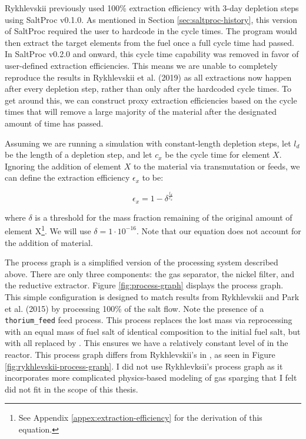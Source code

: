 Rykhlevskii previously used 100\% extraction efficiency with 3-day depletion
steps \cite{rykhlevskii_modeling_2019} using SaltProc v0.1.0. As mentioned in
Section \ref{sec:saltproc-history}, this version of SaltProc required the user
to hardcode in the cycle times. The program would then extract the target
elements from the fuel once a full cycle time had passed. In SaltProc v0.2.0 and
onward, this cycle time capability was removed in favor of user-defined
extraction efficiencies. This means we are unable to completely reproduce the
results in Rykhlevskii et al. (2019)\cite{rykhlevskii_modeling_2019} as all extractions now happen after
every depletion step, rather than only after the hardcoded cycle times.
To get around this, we can construct proxy extraction efficiencies based on the
cycle times that will remove a large majority of the material after the
designated amount of time has passed.

Assuming we are running a simulation with constant-length depletion steps, let
$l_{d}$ be the length of a depletion step, and let $c_{x}$ be the cycle time for
element $X$. Ignoring the addition of element $X$ to the material via
transmutation or feeds, we can define the extraction efficiency $\epsilon_{x}$
to be:

\begin{equation}
    \label{eq:extraction-efficiency}
    \epsilon_{x} = 1 - \delta^{\frac{l_{d}}{c_{x}}}
\end{equation}

where $\delta$ is a threshold for the mass fraction remaining of the original
amount of element X\footnote{See Appendix \ref{appex:extraction-efficiency} for
the derivation of this equation.}. We will use $\delta = 1\cdot 10^{-16}$. Note
that our equation does not account for the addition of material.

The process graph is a simplified version of the processing system described 
above. There are only three components: the gas separator, the nickel filter, and
the reductive extractor. Figure \ref{fig:process-graph} displays the process
graph. This simple configuration is designed to match results from Rykhlevskii
and Park et al. (2015) \cite{park_whole_2015} by processing 100\% of the salt
flow. Note the presence of a \verb.thorium_feed. feed process. This
process replaces the lost mass via reprocessing with an equal mass of fuel salt
of identical composition to the initial fuel salt, but with all 
replaced by . This ensures we have a relatively constant level of
 in the reactor. This process graph differs from Rykhlevskii's
in \cite{rykhlevskii_fuel_2020}, as seen in Figure \ref{fig:rykhlevskii-process-graph}.
I did not use Rykhlevksii's process graph as it incorporates more complicated
physics-based modeling of gas sparging that I felt did not fit in the scope
of this thesis.

